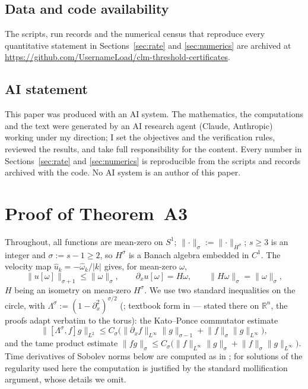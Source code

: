 \documentclass[11pt,a4paper]{article}
\theoremstyle{plain}
\theoremstyle{definition}
\theoremstyle{plain}
\newcommand{\R}{\mathbb{R}}
\newcommand{\Sone}{S^1}
\newcommand{\nrm}[1]{\lVert #1 \rVert}
\newcommand{\abs}[1]{\lvert #1 \rvert}
\begin{document}
\subsection*{Data and code availability}
The scripts, run records and the numerical census that reproduce every quantitative statement in Sections~\ref{sec:rate} and \ref{sec:numerics} are archived at \url{https://github.com/UsernameLoad/clm-threshold-certificates}.

\subsection*{AI statement}
This paper was produced with an AI system. The mathematics, the computations and the text were generated by an AI research agent (Claude, Anthropic) working under my direction; I set the objectives and the verification rules, reviewed the results, and take full responsibility for the content. Every number in Sections~\ref{sec:rate} and \ref{sec:numerics} is reproducible from the scripts and records archived with the code. No AI system is an author of this paper.


\appendix
\setcounter{equation}{0}
\renewcommand{\theequation}{A.\arabic{equation}}
\section{Proof of Theorem~A3}\label{app:A}

Throughout, all functions are mean-zero on $\Sone$; $\nrm{\cdot}_\sigma:=\nrm{\cdot}_{H^\sigma}$; $s\ge3$ is an integer and $\sigma:=s-1\ge2$, so $H^\sigma$ is a Banach algebra embedded in $C^1$. The velocity map $\hat u_k=-\hat\omega_k/\abs{k}$ gives, for mean-zero $\omega$,
\begin{equation}\label{eq:A1}
\nrm{u[\omega]}_{\sigma+1}\le\nrm{\omega}_\sigma,\qquad \partial_xu[\omega]=H\omega,\qquad \nrm{H\omega}_\sigma=\nrm{\omega}_\sigma,
\end{equation}
$H$ being an isometry on mean-zero $H^\sigma$. We use two standard inequalities on the circle, with $\Lambda^\sigma:=(1-\partial_x^2)^{\sigma/2}$ (\cite{KP88}; textbook form in \cite[Ch.~3]{MB02} --- stated there on $\R^n$, the proofs adapt verbatim to the torus): the Kato--Ponce commutator estimate
\begin{equation}\tag{KP}\label{eq:KP}
\nrm{[\Lambda^\sigma,f]g}_{L^2}\le C_\sigma\big(\nrm{\partial_xf}_{L^\infty}\nrm{g}_{\sigma-1}+\nrm{f}_\sigma\nrm{g}_{L^\infty}\big),
\end{equation}
and the tame product estimate $\nrm{fg}_\sigma\le C_\sigma\big(\nrm{f}_{L^\infty}\nrm{g}_\sigma+\nrm{f}_\sigma\nrm{g}_{L^\infty}\big)$. Time derivatives of Sobolev norms below are computed as in \cite[\S5]{OSW08}; for solutions of the regularity used here the computation is justified by the standard mollification argument, whose details we omit.
\end{document}
